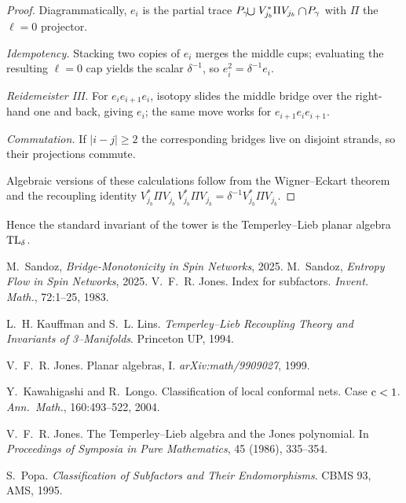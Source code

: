 \documentclass[11pt]{article}
\begin{document}
\begin{proof}
Diagrammatically, $e_i$ is the partial trace
\(
  \smash{P_\gamma\!\mathbin{\raisebox{-0.3ex}{\scalebox{1.2}{$\cup$}}}}
  \;V_{j_b}^{*}\Pi V_{j_b}
  \mathbin{\raisebox{-0.3ex}{\scalebox{1.2}{$\cap$}}}\!P_\gamma
\)
with $\Pi$ the $\ell=0$ projector.  

\emph{Idempotency.}  
Stacking two copies of $e_i$ merges the middle cups; 
evaluating the resulting $\ell=0$ cap yields the scalar $\delta^{-1}$, 
so $e_i^2=\delta^{-1}e_i$.

\emph{Reidemeister III.}  
For $e_ie_{i+1}e_i$, isotopy slides the middle bridge over the right‐hand one
and back, giving $e_i$; the same move works for $e_{i+1}e_ie_{i+1}$.

\emph{Commutation.}  
If $|i-j|\ge2$ the corresponding bridges live on disjoint strands, so their
projections commute.

Algebraic versions of these calculations follow from the 
Wigner--Eckart theorem and the recoupling identity 
$V_{j_b}^{*}\Pi V_{j_b}\,V_{j_b}^{*}\Pi V_{j_b}= \delta^{-1} V_{j_b}^{*}\Pi V_{j_b}$.
\end{proof}

Hence the standard invariant of the tower is the Temperley--Lieb
planar algebra ${\rm TL}_\delta$.



\begin{thebibliography}{9}
 M.~Sandoz, \emph{Bridge-Monotonicity in Spin Networks}, 2025.
 M.~Sandoz, \emph{Entropy Flow in Spin Networks}, 2025.
V.~F.~R. Jones.
\newblock Index for subfactors.
\newblock \emph{Invent. Math.}, 72:1–25, 1983.

L.~H. Kauffman and S.~L. Lins.
\newblock \emph{Temperley–Lieb Recoupling Theory and Invariants of 3–Manifolds}.
\newblock Princeton UP, 1994.

V.~F.~R. Jones.
\newblock Planar algebras, I.
\newblock \emph{arXiv:math/9909027}, 1999.

Y.~Kawahigashi and R.~Longo.
\newblock Classification of local conformal nets.  Case ${\rm c}<1$.
\newblock \emph{Ann.\ Math.}, 160:493–522, 2004.

V.~F.~R. Jones.
\newblock The Temperley–Lieb algebra and the Jones polynomial.
\newblock In \emph{Proceedings of Symposia in Pure Mathematics}, 45 (1986), 335–354.

S.~Popa.
\newblock \emph{Classification of Subfactors and Their Endomorphisms}.
\newblock CBMS 93, AMS, 1995.


\end{thebibliography}
\end{document}
